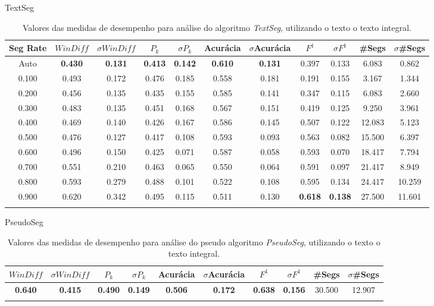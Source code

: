  \newpage
\center TextSeg
\begin{longtable}[c]{|c|c|c|c|c|c|c|c|c|c|c|} 
\hline 
 Seg Rate & $WinDiff$ & $\sigma$$WinDiff$ & $P_k$ & $\sigma$$P_k$ & Acurácia & $\sigma$Acurácia & $F^1$ & $\sigma$$F^1$ & \#Segs & $\sigma$\#Segs\\ \hline 
 Auto & \cellcolor{gray!20} \textbf{0.430} & \cellcolor{gray!20} \textbf{0.131} & \cellcolor{gray!20} \textbf{0.413} & \cellcolor{gray!20} \textbf{0.142} & \cellcolor{gray!20} \textbf{0.610} & \cellcolor{gray!20} \textbf{0.131} & 0.397 & 0.133 & 6.083 & 0.862  \\ \hline 
  0.100 & 0.493 & 0.172 & 0.476 & 0.185 & 0.558 & 0.181 & 0.191 & 0.155 & 3.167 & 1.344  \\ \hline 
  0.200 & 0.456 & 0.135 & 0.435 & 0.155 & 0.585 & 0.141 & 0.347 & 0.115 & 6.083 & 2.660  \\ \hline 
  0.300 & 0.483 & 0.135 & 0.451 & 0.168 & 0.567 & 0.151 & 0.419 & 0.125 & 9.250 & 3.961  \\ \hline 
  0.400 & 0.469 & 0.140 & 0.426 & 0.167 & 0.586 & 0.145 & 0.507 & 0.122 & 12.083 & 5.123  \\ \hline 
  0.500 & 0.476 & 0.127 & 0.417 & 0.108 & 0.593 & 0.093 & 0.563 & 0.082 & 15.500 & 6.397  \\ \hline 
  0.600 & 0.496 & 0.150 & 0.425 & 0.071 & 0.587 & 0.058 & 0.593 & 0.070 & 18.417 & 7.794  \\ \hline 
  0.700 & 0.551 & 0.210 & 0.463 & 0.065 & 0.550 & 0.064 & 0.591 & 0.097 & 21.417 & 8.949  \\ \hline 
  0.800 & 0.593 & 0.279 & 0.488 & 0.101 & 0.522 & 0.108 & 0.595 & 0.134 & 24.417 & 10.259  \\ \hline 
  0.900 & 0.620 & 0.342 & 0.495 & 0.115 & 0.511 & 0.130 & \cellcolor{gray!20} \textbf{0.618} & \cellcolor{gray!20} \textbf{0.138} & 27.500 & 11.601  \\ \hline 
 \caption{Valores das medidas de desempenho para análise do algoritmo \textit{TextSeg}, utilizando o texto o texto integral.}
 \end{longtable} 


 \center PseudoSeg
\begin{longtable}[c]{|c|c|c|c|c|c|c|c|c|c|} 
\hline 
 $WinDiff$ & $\sigma$$WinDiff$ & $P_k$ & $\sigma$$P_k$ & Acurácia & $\sigma$Acurácia & $F^1$ & $\sigma$$F^1$ & \#Segs & $\sigma$\#Segs\\ \hline 
 \cellcolor{gray!20} \textbf{0.640} & \cellcolor{gray!20} \textbf{0.415} & \cellcolor{gray!20} \textbf{0.490} & \cellcolor{gray!20} \textbf{0.149} & \cellcolor{gray!20} \textbf{0.506} & \cellcolor{gray!20} \textbf{0.172} & \cellcolor{gray!20} \textbf{0.638} & \cellcolor{gray!20} \textbf{0.156} & 30.500 & 12.907  \\ \hline 
 \caption{Valores das medidas de desempenho para análise do pseudo algoritmo \textit{PseudoSeg}, utilizando o texto o texto integral.}
 \end{longtable} 
 
